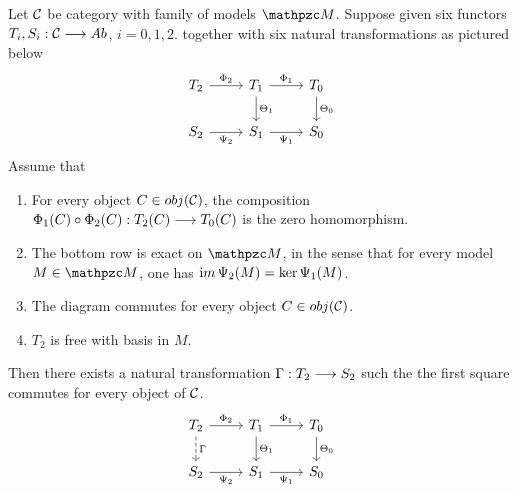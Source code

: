 \documentclass[11pt]{book} %
\begin{document}
\begin{lemma}\label{appendixA:lem:A.1.4}
Let ${\cal C}$ be category with family of models $\pzm$. Suppose given six functors
$T_i,S_i:{\cal C}\longrightarrow Ab$, $i=0,1,2$. together with six natural transformations as pictured below
\[
\begin{tikzcd}
T_2 \arrow[r, "\Phi_2"] & T_1 \arrow[r, "\Phi_1"] \arrow[d, "\Theta_1"] & T_0 \arrow[d, "\Theta_0"] \\
S_2 \arrow[r, "\Psi_2"'] & S_1 \arrow[r, "\Psi_1"'] & S_0
\end{tikzcd}
\]
Assume that 
\begin{enumerate}
	\item For every object $C\in obj({\cal C})$, the composition $\Phi_1(C)\circ \Phi_2(C):T_2(C)\longrightarrow T_0(C)$ is the zero homomorphism.
	\item The bottom row is exact on $\pzm$, in the sense that for every model $M\in\pzm$, one has ${\text im\thinspace} \Psi_2(M)=\ker \Psi_1(M)$.
	\item The diagram commutes for every object $C\in obj({\cal C})$.
	\item $T_2$ is free with basis in $M$.
\end{enumerate}
Then there exists a natural transformation $\Gamma:T_2\longrightarrow S_2$ such the the first square commutes for every object of ${\cal C}$.
\[
\begin{tikzcd}
T_2\ar[d, dashed, "\Gamma"] \arrow[r, "\Phi_2"] & T_1 \arrow[r, "\Phi_1"] \arrow[d, "\Theta_1"] & T_0 \arrow[d, "\Theta_0"] \\
S_2 \arrow[r, "\Psi_2"'] & S_1 \arrow[r, "\Psi_1"'] & S_0
\end{tikzcd}
\]
\end{lemma}
\end{document}
